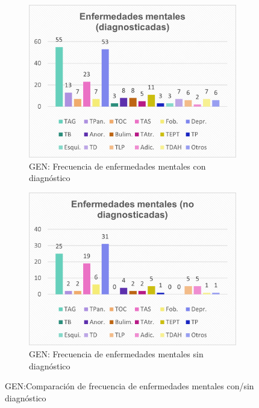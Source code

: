 \documentclass[12pt, a4paper,twoside,titlepage]{book}
\begin{document}
\begin{figure}
	\centering
	\begin{subfigure}{.5\textwidth}
		\centering
		\includegraphics[width=.95\linewidth]{ANEXO Gen/25AnexGENEnffem}
		\caption{GEN: Frecuencia de enfermedades mentales con diagnóstico}
	\end{subfigure}%
	\begin{subfigure}{.5\textwidth}
		\centering
		\includegraphics[width=.95\linewidth]{ANEXO Gen/26AnexGENEnffem}
		\caption{GEN: Frecuencia de enfermedades mentales sin diagnóstico}
	\end{subfigure}
	\caption{GEN:Comparación de frecuencia de enfermedades mentales con/sin diagnóstico}
	\label{fig:GENFrecenfdiag}
\end{figure}
\end{document}
